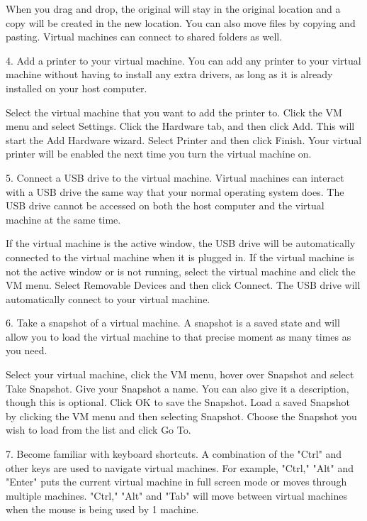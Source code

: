 When you drag and drop, the original will stay in the original location and a copy will be created in the new location.
You can also move files by copying and pasting.
Virtual machines can connect to shared folders as well.


4. Add a printer to your virtual machine. You can add any printer to your virtual machine without having to install any extra drivers, as long as it is already installed on your host computer.

Select the virtual machine that you want to add the printer to.
Click the VM menu and select Settings.
Click the Hardware tab, and then click Add. This will start the Add Hardware wizard.
Select Printer and then click Finish. Your virtual printer will be enabled the next time you turn the virtual machine on.


5. Connect a USB drive to the virtual machine. Virtual machines can interact with a USB drive the same way that your normal operating system does. The USB drive cannot be accessed on both the host computer and the virtual machine at the same time.

If the virtual machine is the active window, the USB drive will be automatically connected to the virtual machine when it is plugged in.
If the virtual machine is not the active window or is not running, select the virtual machine and click the VM menu. Select Removable Devices and then click Connect. The USB drive will automatically connect to your virtual machine.


6. Take a snapshot of a virtual machine. A snapshot is a saved state and will allow you to load the virtual machine to that precise moment as many times as you need.

Select your virtual machine, click the VM menu, hover over Snapshot and select Take Snapshot.
Give your Snapshot a name. You can also give it a description, though this is optional.
Click OK to save the Snapshot.
Load a saved Snapshot by clicking the VM menu and then selecting Snapshot. Choose the Snapshot you wish to load from the list and click Go To.


7. Become familiar with keyboard shortcuts. A combination of the "Ctrl" and other keys are used to navigate virtual machines. For example, "Ctrl," "Alt" and "Enter" puts the current virtual machine in full screen mode or moves through multiple machines. "Ctrl," "Alt" and "Tab" will move between virtual machines when the mouse is being used by 1 machine.

